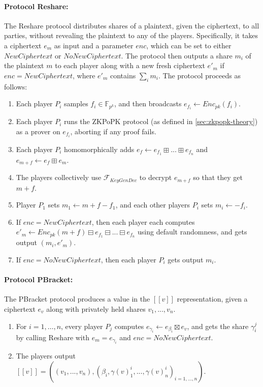\documentclass[../main.tex]{subfiles}
\begin{document}
\paragraph{Protocol Reshare:}
The Reshare protocol distributes shares of a plaintext, given the ciphertext, to all parties, without revealing the plaintext to any of the players.
Specifically, it takes a ciphertext $e_m$ as input and a parameter $enc$, which can be set to either $NewCiphertext$ or $NoNewCiphertext$. The protocol then outputs a share $m_i$ of the plaintext $m$ to each player along with a new fresh ciphertext $e'_m$ if $enc = NewCiphertext$, where $e'_m$ contains $\sum_i m_i$.
The protocol proceeds as follows:
\begin{enumerate}
    \item Each player $P_i$ samples $f_i \in \mathbb{F}_{p^k}$, and then broadcasts $e_{f_i} \leftarrow Enc_{pk}(f_i)$.
    \item Each player $P_i$ runs the ZKPoPK protocol (as defined in \ref{sec:zkpopk-theory}) as a prover on $e_{f_i}$, aborting if any proof fails.
    \item Each player $P_i$ homomorphically adds $e_f \leftarrow e_{f_1} \boxplus ... \boxplus e_{f_n}$ and $e_{m+f} \gets e_f \boxplus e_m$.
    \item The players collectively use $\mathcal{F}_{KeyGenDec}$ to decrypt $e_{m + f}$ so that they get $m + f$.
    \item Player $P_1$ sets $m_1 \gets m + f - f_1$, and each other players $P_i$ sets $m_i \leftarrow - f_i$.
    \item If $enc = NewCiphertext$, then each player each computes $e'_m \leftarrow Enc_{pk}(m + f) \boxminus e_{f_1} \boxminus ... \boxminus e_{f_n}$ using default randomness, and gets output $(m_i, e'_m)$.
    \item If $enc = NoNewCiphertext$, then each player $P_i$ gets output $m_i$.
\end{enumerate}

\paragraph{Protocol PBracket:}
The PBracket protocol produces a value in the $[\![ v ]\!]$ representation, given a ciphertext $e_v$ along with privately held shares $v_1, ..., v_n$.
\begin{enumerate}
    \item For $i = 1, \dots, n$, every player $P_j$ computes $e_{\gamma_i} \leftarrow e_{\beta_i} \boxtimes e_v$, and gets the share $\gamma^j_i$ by calling Reshare with $e_m = e_{\gamma_i}$ and $enc = NoNewCiphertext$.
    \item The players output $[\![ v ]\!] = ((v_1, ..., v_n), (\beta_i, \gamma(v)^i_1, ..., \gamma(v)^i_n)_{i = 1, ..., n})$.
\end{enumerate}
\end{document}

